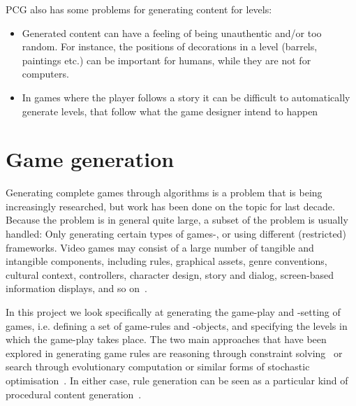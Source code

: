 \documentclass[a4paper,titlepage,final, twoside]{report}
\begin{document}
PCG also has some problems for generating content for levels:

\begin{itemize}
  \item Generated content can have a feeling of being unauthentic and/or too random. For instance, the positions of decorations in a level (barrels, paintings etc.) can be important for humans, while they are not for computers.
  \item In games where the player follows a story it can be difficult to automatically generate levels, that follow what the game designer intend to happen%
\end{itemize}




\section{Game generation}
Generating complete games through algorithms is a problem that is being increasingly researched, but work has been done on the topic for last decade. Because the problem is in general quite large, a subset of the problem is usually handled: Only generating certain types of games-, or using different (restricted) frameworks. 
Video games may consist of a large number of tangible and intangible components, including rules, graphical assets, genre conventions, cultural context, controllers, character design, story and dialog, screen-based information displays, and so on~\citet{cook2014angelina,liapis2014creativity,nelson2007automated}.

In this project we look specifically at generating the game-play and -setting of games, i.e. defining a set of game-rules and -objects, and specifying the levels in which the game-play takes place.
The two main approaches that have been explored in generating game rules are reasoning through constraint solving~\citet{smith2010variations} or search through evolutionary computation or similar forms of stochastic optimisation~\citet{togelius2008experiment,browne2008automated,font2013towards}. 
In either case, rule generation can be seen as a particular kind of procedural content generation~\citet{pcgbook:ch6}.

\end{document}
